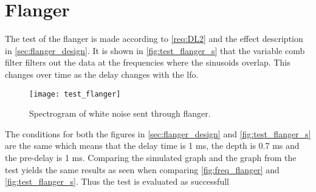 

\section{Flanger}\label{sec:flanger_test}


The test of the flanger is made according to \autoref{req:DL2} and the effect description in \autoref{sec:flanger_design}.
It is shown in \autoref{fig:test_flanger_s} that the variable comb filter filters out the data at the frequencies where the sinusoids overlap. This changes over time as the delay changes with the \gls{lfo}.
\begin{figure}[hbpt]
	\centering
	\texttt{[image: test\_flanger]}
	\caption{Spectrogram of white noise sent through flanger.}
	\label{fig:test_flanger_s}
\end{figure}

The conditions for both the figures in \autoref{sec:flanger_design} and \autoref{fig:test_flanger_s} are the same which means that the delay time is 1 \si{\milli\second}, the depth is 0.7 \si{\milli\second} and the pre-delay is 1 \si{\milli\second}. Comparing the simulated graph and the graph from the test yields the same results as seen when comparing \autoref{fig:freq_flanger} and \autoref{fig:test_flanger_s}. Thus the test is evaluated as successfull 

